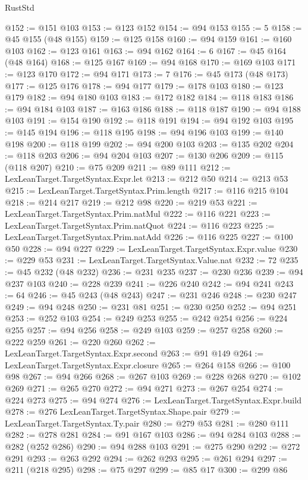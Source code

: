 \begin{lexlean}{RustStd}
\begin{coremodule}
{\begin{coremodule}
{{{{{{{{{{{{{{{{{{{{{{{{{{{{{{{{{{{{{@152 := @151 @103
@153 := @123 @152
@154 := @94 @153
@155 := 5
@158 := @45 @155 (@48 @155)
@159 := @125 @158
@160 := @94 @159
@161 := @160 @103
@162 := @123 @161
@163 := @94 @162
@164 := 6
@167 := @45 @164 (@48 @164)
@168 := @125 @167
@169 := @94 @168
@170 := @169 @103
@171 := @123 @170
@172 := @94 @171
@173 := 7
@176 := @45 @173 (@48 @173)
@177 := @125 @176
@178 := @94 @177
@179 := @178 @103
@180 := @123 @179
@182 := @94 @180 @103
@183 := @172 @182
@184 := @118 @183
@186 := @94 @184 @103
@187 := @163 @186
@188 := @118 @187
@190 := @94 @188 @103
@191 := @154 @190
@192 := @118 @191
@194 := @94 @192 @103
@195 := @145 @194
@196 := @118 @195
@198 := @94 @196 @103
@199 := @140 @198
@200 := @118 @199
@202 := @94 @200 @103
@203 := @135 @202
@204 := @118 @203
@206 := @94 @204 @103
@207 := @130 @206
@209 := @115 (@118 @207)
@210 := @75 @209
@211 := @89 @111
@212 := LexLeanTarget.TargetSyntax.Expr.let
@213 := @212 @50
@214 := @213 @53
@215 := LexLeanTarget.TargetSyntax.Prim.length
@217 := @116 @215 @104
@218 := @214 @217
@219 := @212 @98
@220 := @219 @53
@221 := LexLeanTarget.TargetSyntax.Prim.natMul
@222 := @116 @221
@223 := LexLeanTarget.TargetSyntax.Prim.natQuot
@224 := @116 @223
@225 := LexLeanTarget.TargetSyntax.Prim.natAdd
@226 := @116 @225
@227 := @100 @50
@228 := @94 @227
@229 := LexLeanTarget.TargetSyntax.Expr.value
@230 := @229 @53
@231 := LexLeanTarget.TargetSyntax.Value.nat
@232 := 72
@235 := @45 @232 (@48 @232)
@236 := @231 @235
@237 := @230 @236
@239 := @94 @237 @103
@240 := @228 @239
@241 := @226 @240
@242 := @94 @241
@243 := 64
@246 := @45 @243 (@48 @243)
@247 := @231 @246
@248 := @230 @247
@249 := @94 @248
@250 := @231 @81
@251 := @230 @250
@252 := @94 @251
@253 := @252 @103
@254 := @249 @253
@255 := @242 @254
@256 := @224 @255
@257 := @94 @256
@258 := @249 @103
@259 := @257 @258
@260 := @222 @259
@261 := @220 @260
@262 := LexLeanTarget.TargetSyntax.Expr.second
@263 := @91 @149
@264 := LexLeanTarget.TargetSyntax.Expr.closure
@265 := @264 @158
@266 := @100 @98
@267 := @94 @266
@268 := @267 @103
@269 := @228 @268
@270 := @102 @269
@271 := @265 @270
@272 := @94 @271
@273 := @267 @254
@274 := @224 @273
@275 := @94 @274
@276 := LexLeanTarget.TargetSyntax.Expr.build
@278 := @276 LexLeanTarget.TargetSyntax.Shape.pair
@279 := LexLeanTarget.TargetSyntax.Ty.pair
@280 := @279 @53
@281 := @280 @111
@282 := @278 @281
@284 := @91 @167 @103
@286 := @94 @284 @103
@288 := @282 (@252 @286)
@290 := @94 @288 @103
@291 := @275 @290
@292 := @272 @291
@293 := @263 @292
@294 := @262 @293
@295 := @261 @294
@297 := @211 (@218 @295)
@298 := @75 @297
@299 := @85 @17
@300 := @299 @86
}}}}}}}}}}}}}}}}}}}}}}}}}}}}}}}}}}}}}
\end{coremodule}}
\end{coremodule}
\end{lexlean}
